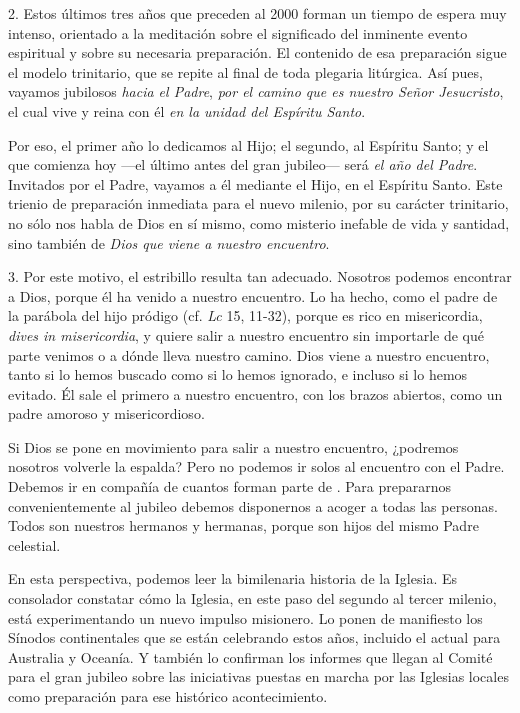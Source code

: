 \begin{body}
	2. Estos últimos tres años que preceden al 2000 forman un tiempo de espera muy intenso, orientado a la meditación sobre el significado del inminente evento espiritual y sobre su necesaria preparación. El contenido de esa preparación sigue el modelo trinitario, que se repite al final de toda plegaria litúrgica. Así pues, vayamos jubilosos \emph{hacia el Padre}, \emph{por el camino que es nuestro Señor Jesucristo}, el cual vive y reina con él \emph{en la unidad del Espíritu Santo}. 
	
	Por eso, el primer año lo dedicamos al Hijo; el segundo, al Espíritu Santo; y el que comienza hoy ---el último antes del gran jubileo--- será \emph{el año del Padre}. Invitados por el Padre, vayamos a él mediante el Hijo, en el Espíritu Santo. Este trienio de preparación inmediata para el nuevo milenio, por su carácter trinitario, no sólo nos habla de Dios en sí mismo, como misterio inefable de vida y santidad, sino también de \emph{Dios que viene a nuestro encuentro}. 
	
	3. Por este motivo, el estribillo  resulta tan adecuado. Nosotros podemos encontrar a Dios, porque él ha venido a nuestro encuentro. Lo ha hecho, como el padre de la parábola del hijo pródigo (cf. \emph{Lc} 15, 11-32), porque es rico en misericordia, \emph{dives in misericordia}, y quiere salir a nuestro encuentro sin importarle de qué parte venimos o a dónde lleva nuestro camino. Dios viene a nuestro encuentro, tanto si lo hemos buscado como si lo hemos ignorado, e incluso si lo hemos evitado. Él sale el primero a nuestro encuentro, con los brazos abiertos, como un padre amoroso y misericordioso. 
	
	Si Dios se pone en movimiento para salir a nuestro encuentro, ¿podremos nosotros volverle la espalda? Pero no podemos ir solos al encuentro con el Padre. Debemos ir en compañía de cuantos forman parte de . Para prepararnos convenientemente al jubileo debemos disponernos a acoger a todas las personas. Todos son nuestros hermanos y hermanas, porque son hijos del mismo Padre celestial. 
	
	En esta perspectiva, podemos leer la bimilenaria historia de la Iglesia. Es consolador constatar cómo la Iglesia, en este paso del segundo al tercer milenio, está experimentando un nuevo impulso misionero. Lo ponen de manifiesto los Sínodos continentales que se están celebrando estos años, incluido el actual para Australia y Oceanía. Y también lo confirman los informes que llegan al Comité para el gran jubileo sobre las iniciativas puestas en marcha por las Iglesias locales como preparación para ese histórico acontecimiento. 
	

\end{body}
